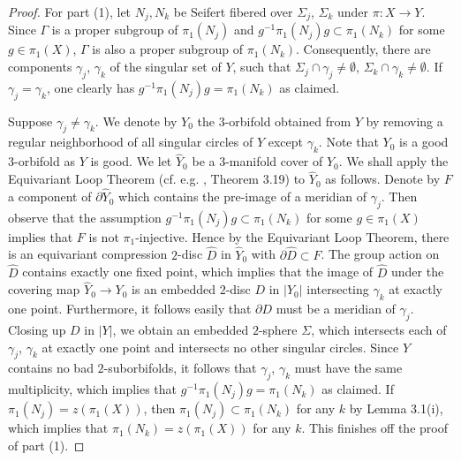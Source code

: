 \documentclass[11pt]{amsart}
\theoremstyle{plain}
\numberwithin{theorem}{section}
\theoremstyle{definition}
\begin{document}
\begin{proof}
For part (1), let $N_j,N_k$ be Seifert fibered over $\Sigma_j$, $\Sigma_k$ under
$\pi:X\rightarrow Y$. Since $\Gamma$
is a proper subgroup of $\pi_1(N_j)$ and $g^{-1}\pi_1(N_j)g\subset \pi_1(N_k)$ for some $g\in \pi_1(X)$, 
$\Gamma$ is also a proper subgroup of $\pi_1(N_k)$. Consequently, there are
components $\gamma_j$, $\gamma_k$ of the singular set of $Y$, such that 
$\Sigma_j\cap \gamma_j\neq \emptyset$, $\Sigma_k\cap \gamma_k\neq \emptyset$.
If $\gamma_j=\gamma_k$, one clearly has $g^{-1}\pi_1(N_j)g=\pi_1(N_k)$ as claimed.

Suppose $\gamma_j\neq\gamma_k$. We denote by $Y_0$ the $3$-orbifold obtained from $Y$ by
removing a regular neighborhood of all singular circles of $Y$ except $\gamma_k$. Note that $Y_0$
is a good $3$-orbifold as $Y$ is good. We let $\hat{Y}_0$ be a $3$-manifold cover of $Y_0$. 
We shall apply the Equivariant Loop Theorem (cf. e.g. \cite{BMP}, Theorem 3.19) to $\hat{Y}_0$
as follows. Denote by $F$ a component of $\partial \hat{Y}_0$ which contains the pre-image of
a meridian of $\gamma_j$. Then observe that the assumption $g^{-1}\pi_1(N_j)g\subset \pi_1(N_k)$ for some $g\in \pi_1(X)$ implies that $F$ is not $\pi_1$-injective. Hence by the Equivariant Loop Theorem,
there is an equivariant compression $2$-disc $\hat{D}$ in $\hat{Y}_0$ with $\partial \hat{D}\subset F$. 
The group action on $\hat{D}$ contains exactly one fixed point, which implies that the image of $\hat{D}$
under the covering map $\hat{Y}_0\rightarrow Y_0$ is an embedded $2$-disc $D$ in $|Y_0|$ intersecting
$\gamma_k$ at exactly one point. Furthermore, it follows easily that $\partial D$ must be a meridian
of $\gamma_j$. Closing up $D$ in $|Y|$, we obtain an embedded $2$-sphere $\Sigma$, which intersects each of $\gamma_j$, $\gamma_k$ at exactly one point and intersects no other singular circles. 
Since $Y$ contains no bad $2$-suborbifolds, it follows that $\gamma_j$, $\gamma_k$ must have the
same multiplicity, which implies that $g^{-1}\pi_1(N_j)g=\pi_1(N_k)$ as claimed. If 
$\pi_1(N_j)=z(\pi_1(X))$, then $\pi_1(N_j)\subset \pi_1(N_k)$ for any $k$ by Lemma 3.1(i),
which implies that $\pi_1(N_k)=z(\pi_1(X))$ for any $k$. This finishes off the proof of part (1). 


\end{proof}
\end{document}
